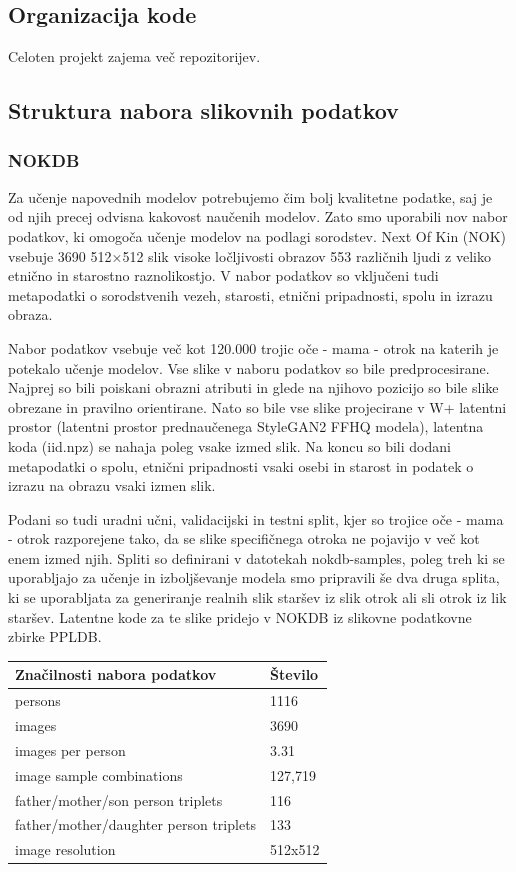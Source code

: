 \documentclass[a4paper,12pt,openright]{book}
\begin{document}
\subsection{Organizacija kode}

Celoten projekt zajema več repozitorijev. 




\subsection{Struktura nabora slikovnih podatkov}
\subsubsection{NOKDB \cite{}}
Za učenje napovednih modelov potrebujemo čim bolj kvalitetne podatke, saj je od njih precej odvisna kakovost naučenih modelov. Zato smo uporabili nov nabor podatkov, ki omogoča učenje modelov na podlagi sorodstev. Next Of Kin (NOK) vsebuje 3690 512×512 slik visoke ločljivosti obrazov 553 različnih ljudi z veliko etnično in starostno raznolikostjo. V nabor podatkov so vključeni tudi metapodatki o sorodstvenih vezeh, starosti, etnični pripadnosti, spolu in izrazu obraza.

Nabor podatkov vsebuje več kot 120.000 trojic oče - mama - otrok na katerih je potekalo učenje modelov. Vse slike v naboru podatkov so bile predprocesirane. Najprej so bili poiskani obrazni atributi in glede na njihovo pozicijo so bile slike obrezane in pravilno orientirane. Nato so bile vse slike projecirane v W+ latentni prostor (latentni prostor prednaučenega StyleGAN2 FFHQ modela), latentna koda (iid.npz) se nahaja poleg vsake izmed slik. Na koncu so bili dodani metapodatki o spolu, etnični pripadnosti vsaki osebi in starost in podatek o izrazu na obrazu vsaki izmen slik.

Podani so tudi uradni učni, validacijski in testni split, kjer so trojice oče - mama - otrok razporejene tako, da se slike specifičnega otroka ne pojavijo v več kot enem izmed njih. Spliti so definirani v datotekah nokdb-samples, poleg treh ki se uporabljajo za učenje in izboljševanje modela smo pripravili še dva druga splita, ki se uporabljata za generiranje realnih slik staršev iz slik otrok ali sli otrok iz lik staršev. Latentne kode za te slike pridejo v NOKDB iz slikovne podatkovne zbirke PPLDB.

\begin{center}
  \begin{tabular}{|l|l|}
  \hline
  Značilnosti nabora podatkov & Število \\
  \hline
  persons & 1116 \\
  images & 3690 \\
  images per person & 3.31 \\
  image sample combinations & 127,719 \\
  father/mother/son person triplets & 116 \\
  father/mother/daughter person triplets & 133 \\
  image resolution & 512x512 \\
  \hline
  \end{tabular}
\end{center}
\end{document}

